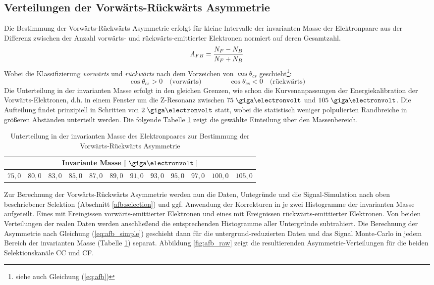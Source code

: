 \subsection{Verteilungen der Vorwärts-Rückwärts Asymmetrie}
Die Bestimmung der Vorwärts-Rückwärts Asymmetrie erfolgt für kleine Intervalle
der invarianten Masse der Elektronpaare aus der Differenz zwischen der Anzahl
vorwärts- und rückwärts-emittierter Elektronen normiert auf deren Gesamtzahl.
\begin{equation}
    A_{FB} = \frac{N_F - N_B}{N_F + N_B}
    \label{eq:afb_simple}
\end{equation}
Wobei die Klassifizierung \textit{vorwärts} und \textit{rückwärts} nach dem
Vorzeichen von $\cos\theta_{cs}$ geschieht\footnote{siehe auch Gleichung
(\ref{eq:afb})}:
\begin{equation}
    \cos\theta_{cs} > 0 \quad\text{(vorwärts)}
    \qquad \qquad
    \cos\theta_{cs} < 0 \quad\text{(rückwärts)}
\end{equation}
Die Unterteilung in der invarianten Masse erfolgt in den gleichen Grenzen, wie
schon die Kurvenanpassungen der Energiekalibration der Vorwärts-Elektronen,
d.h. in einem Fenster um die Z-Resonanz zwischen $75\GeV$ und $105\GeV$. Die
Aufteilung findet prinzipiell in Schritten von $2\GeV$ statt, wobei die
statistisch weniger polpulierten Randbreiche in größeren Abständen unterteilt
werden. Die folgende Tabelle \ref{tab:binning_afb} zeigt die gewählte
Einteilung über den Massenbereich.
\begin{table}[h]
    \centering
    \begin{tabular}{|c|c|c|c|c|c|c|c|c|c|c|c|}
        \multicolumn{12}{c}{\textbf{Invariante Masse} [$\GeV\:$]} \\
        \hline
        $75,0$ & $80,0$ & $83,0$ & $85,0$ & $87,0$ & $89,0$ & $91,0$ & $93,0$ &
        $95,0$ & $97,0$ & $100,0$ & $105,0$
        \\ \hline
    \end{tabular}
    \caption[Unterteilung in der invarianten Masse des Elektronpaares zur
        Bestimmung der Vorwärts-Rückwärts Asymmetrie]
        {Unterteilung in der invarianten Masse des Elektronpaares zur
        Bestimmung der Vorwärts-Rückwärts Asymmetrie}
    \label{tab:binning_afb}
\end{table}

Zur Berechnung der Vorwärts-Rückwärts Asymmetrie werden nun die Daten,
Untegründe und die Signal-Simulation nach oben beschriebener Selektion
(Abschnitt \ref{afb:selection}) und ggf. Anwendung der Korrekturen in je zwei
Histogramme der invarianten Masse aufgeteilt. Eines mit Ereingissen
vorwärts-emittierter Elektronen und eines mit Ereignissen rückwärts-emittierter
Elektronen. Von beiden Verteilungen der realen Daten werden anschließend die
entsprechenden Histogramme aller Untergründe subtrahiert. Die Berechnung der
Asymmetrie nach Gleichung (\ref{eq:afb_simple}) geschieht dann für die
untergrund-reduzierten Daten und das Signal Monte-Carlo in jedem Bereich der
invarianten Masse (Tabelle \ref{tab:binning_afb}) separat. Abbildung
\ref{fig:afb_raw} zeigt die resultierenden Asymmetrie-Verteilungen für die
beiden Selektionskanäle \ac{CC} und \ac{CF}.

